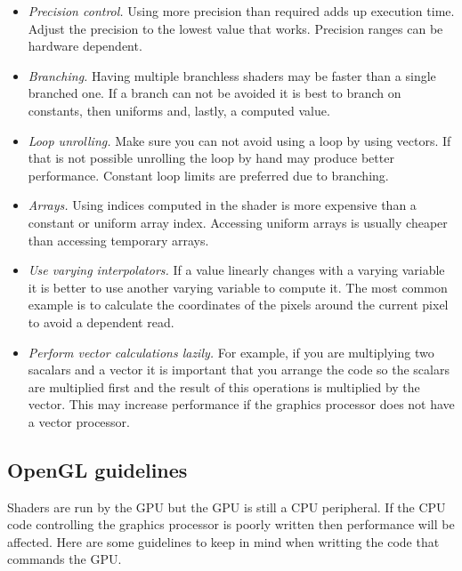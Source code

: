 \documentclass[conference]{IEEEtran}
\begin{document}
\begin{itemize} %
 \item \emph{Precision control.} Using more precision than required adds up execution time. Adjust the precision to the lowest value that works. Precision ranges can be hardware dependent. 
 \item \emph{Branching.} Having multiple branchless shaders may be faster than a single branched one. If a branch can not be avoided it is best to branch on constants, then uniforms and, lastly, a computed value. 
 \item \emph{Loop unrolling.} Make sure you can not avoid using a loop by using vectors. If that is not possible unrolling the loop by hand may produce better performance. Constant loop limits are preferred due to branching.
 \item \emph{Arrays.} Using indices computed in the shader is more expensive than a constant or uniform array index. Accessing uniform arrays is usually cheaper than accessing temporary arrays.
 \item \emph{Use varying interpolators.} If a value linearly changes with a varying variable it is better to use another varying variable to compute it. The most common example is to calculate the coordinates of the pixels around the current pixel to avoid a dependent read.
 \item \emph{Perform vector calculations lazily.} For example, if you are multiplying two sacalars and a vector it is important that you arrange the code so the scalars are multiplied first and the result of this operations is multiplied by the vector. This may increase performance if the graphics processor does not have a vector processor.
\end{itemize}

 \subsection{OpenGL guidelines} 
Shaders are run by the GPU but the GPU is still a CPU peripheral. If the CPU code controlling the graphics processor is poorly written then performance will be affected. Here are some guidelines to keep in mind when writting the code that commands the GPU.
\end{document}
